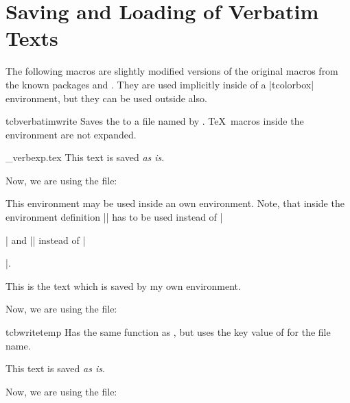 \clearpage
\section{Saving and Loading of Verbatim Texts}%
%
The following macros are slightly modified versions of the original macros
from the known packages  and .
They are used implicitly inside of a |tcolorbox| environment,
but they can be used outside also.
\enlargethispage*{1.5cm}

\begin{docEnvironment}{tcbverbatimwrite}{}
  Saves the  to a file named by .
  \TeX\ macros inside the environment are not expanded.
\begin{dispExample}
\begin{tcbverbatimwrite}{\jobname_verbexp.tex}
  This text is saved \textit{as is}.
\end{tcbverbatimwrite}

Now, we are using the file:\par

\end{dispExample}

This environment may be used inside an own environment. Note, that inside
the environment definition |\tcbverbatimwrite| has to be used instead of
|\begin{tcbverbatimwrite}| and |\endtcbverbatimwrite| instead of |\end{tcbverbatimwrite}|.
\begin{dispExample}
\newenvironment{myverbatim}{%
  \begingroup{}}%
  {\endtcbverbatimwrite\endgroup}

\begin{myverbatim}
  This is the text which is saved by my own environment.
\end{myverbatim}

Now, we are using the file:\par

\end{dispExample}
\end{docEnvironment}

\begin{docEnvironment}{tcbwritetemp}{}
  Has the same function as , but uses the key value
  of  for the file name.
\begin{dispExample}
\begin{tcbwritetemp}
  This text is saved \textit{as is}.
\end{tcbwritetemp}

Now, we are using the file:\par
\tcbusetemp
\end{dispExample}
\end{docEnvironment}



